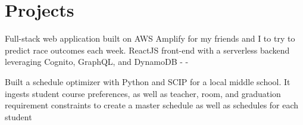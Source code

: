\documentclass[]{plushcv}
\begin{document}
\begin{minipage}[t]{0.7\textwidth}



\section{Projects}

\begin{tightemize}
\item Full-stack web application built on AWS Amplify for my friends and I to 
try to predict race outcomes each week. ReactJS front-end with a serverless 
backend leveraging Cognito, GraphQL, and DynamoDB \aws - \react - \graphql \\
\end{tightemize}
\sectionsep

\begin{tightemize}
\item Built a schedule optimizer with Python and SCIP for a local middle school.
 It ingests student course preferences, as well as teacher, room, and graduation
  requirement constraints to create a master schedule as well as schedules for 
  each student \python\\

\end{tightemize}
\sectionsep




\end{minipage}
\end{document}
